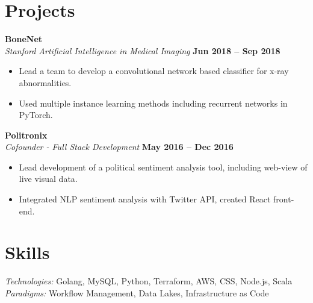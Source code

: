 \documentclass[margin,line]{resume}
\begin{document}
\begin{resume}
   \section{\mysidestyle Projects}

    \textbf{BoneNet} \vspace{1mm}\\\vspace{1mm}%
    \textsl{Stanford Artificial Intelligence in Medical Imaging} \hfill \textbf{Jun 2018 -- Sep 2018}
    \begin{itemize}
        \item Lead a team to develop a convolutional network based classifier for x-ray abnormalities.
        \item Used multiple instance learning methods including recurrent networks in PyTorch.
    \end{itemize}

    \textbf{Politronix} \vspace{1mm}\\\vspace{1mm}%
    \textsl{Cofounder - Full Stack Development} \hfill \textbf{May 2016 -- Dec 2016}
    \begin{itemize}
        \item Lead development of a political sentiment analysis tool, including web-view of live visual data.
        \item Integrated NLP sentiment analysis with Twitter API, created React front-end.
    \end{itemize}

    \section{\mysidestyle Skills}

    \emph{Technologies:} Golang, MySQL, Python, Terraform, AWS, CSS, Node.js, Scala \\
    \emph{Paradigms:} Workflow Management, Data Lakes, Infrastructure as Code

\end{resume}
\end{document}
